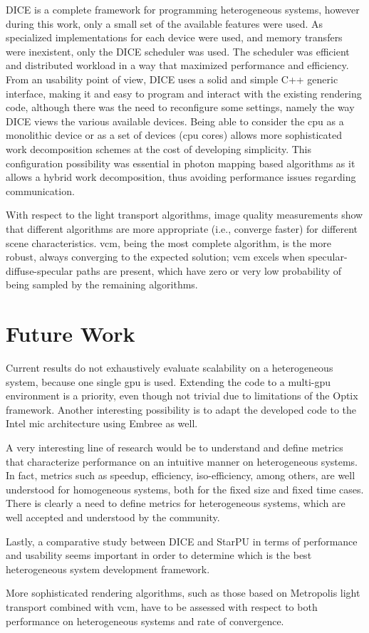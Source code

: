 DICE is a complete framework for programming heterogeneous systems, however during this work, only a small set of the available features were used. As specialized implementations for each device were used, and memory transfers were inexistent, only the DICE scheduler was used. The scheduler was efficient and distributed workload in a way that maximized performance and efficiency. From an usability point of view, DICE uses a solid and simple C++ generic interface, making it and easy to program and interact with the existing rendering code, although there was the need to reconfigure some settings, namely the way DICE views the various available devices. Being able to consider the \gls{cpu} as a monolithic device or as a set of devices (\gls{cpu} cores) allows more sophisticated work decomposition schemes at the cost of developing simplicity. This configuration possibility was essential in photon mapping based algorithms as it allows a hybrid work decomposition, thus avoiding performance issues regarding communication.

With respect to the light transport algorithms, image quality measurements show that different algorithms are more appropriate (i.e., converge faster) for different scene characteristics. \gls{vcm}, being the most complete algorithm, is the more robust, always converging to the expected solution; \gls{vcm} excels when specular-diffuse-specular paths are present, which have zero or very low probability of being sampled by the remaining algorithms.

\section{Future Work}

Current results do not exhaustively evaluate scalability on a heterogeneous system, because one single \gls{gpu} is used. Extending the code to a multi-\gls{gpu} environment is a priority, even though not trivial due to limitations of the Optix framework. Another interesting possibility is to adapt the developed code to the Intel \gls{mic} architecture using Embree as well.

A very interesting line of research would be to understand and define metrics that characterize performance on an intuitive manner on heterogeneous systems. In fact, metrics such as speedup, efficiency, iso-efficiency, among others, are well understood for homogeneous systems, both for the fixed size and fixed time cases. There is clearly a need to define metrics for heterogeneous systems, which are well accepted and understood by the community. 

Lastly, a comparative study between DICE and StarPU in terms of performance and usability seems important in order to determine which is the best heterogeneous system development framework.

More sophisticated rendering algorithms, such as those based on Metropolis light transport combined with \gls{vcm}, have to be assessed with respect to both performance on heterogeneous systems and rate of convergence.

